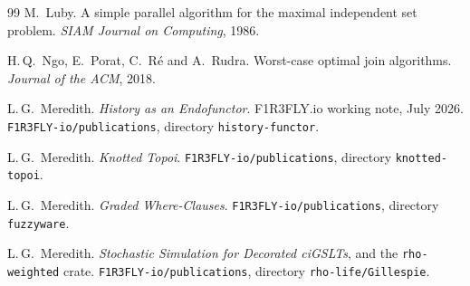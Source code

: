 \documentclass[11pt,a4paper]{article}
\theoremstyle{plain}
\theoremstyle{definition}
\theoremstyle{remark}
\begin{document}
\begin{thebibliography}{99}
M.\ Luby.
\newblock A simple parallel algorithm for the maximal independent set problem.
\newblock \emph{SIAM Journal on Computing}, 1986.

H.\,Q.\ Ngo, E.\ Porat, C.\ R\'e and A.\ Rudra.
\newblock Worst-case optimal join algorithms.
\newblock \emph{Journal of the ACM}, 2018.

L.\,G.\ Meredith.
\newblock \emph{History as an Endofunctor}.
\newblock F1R3FLY.io working note, July 2026.
\newblock \texttt{F1R3FLY-io/publications}, directory \texttt{history-functor}.

L.\,G.\ Meredith.
\newblock \emph{Knotted Topoi}.
\newblock \texttt{F1R3FLY-io/publications}, directory \texttt{knotted-topoi}.

L.\,G.\ Meredith.
\newblock \emph{Graded Where-Clauses}.
\newblock \texttt{F1R3FLY-io/publications}, directory \texttt{fuzzyware}.

L.\,G.\ Meredith.
\newblock \emph{Stochastic Simulation for Decorated ciGSLTs}, and the
\texttt{rho-weighted} crate.
\newblock \texttt{F1R3FLY-io/publications}, directory
\texttt{rho-life/Gillespie}.

\end{thebibliography}
\end{document}
